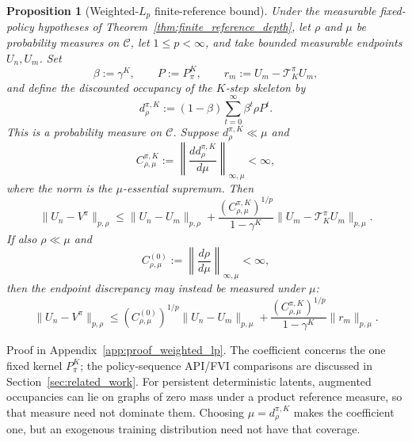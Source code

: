 \documentclass{article}
\theoremstyle{plain}
\newtheorem{proposition}[theorem]{Proposition}
\theoremstyle{definition}
\theoremstyle{remark}
\begin{document}
\begin{proposition}[Weighted-$L_p$ finite-reference bound]
\label{prop:weighted_finite_reference}
Under the measurable fixed-policy hypotheses of
Theorem~\ref{thm:finite_reference_depth}, let $\rho$ and $\mu$ be probability
measures on $\mathcal C$, let $1\le p<\infty$, and take bounded measurable
endpoints $U_n,U_m$. Set
\begin{equation}
\beta:=\gamma^K,
\qquad
P:=P_\pi^K,
\qquad
r_m:=U_m-\mathcal T_K^\pi U_m,
\label{eq:weighted_objects}
\end{equation}
and define the discounted occupancy of the $K$-step skeleton by
\begin{equation}
d_\rho^{\pi,K}
:=(1-\beta)\sum_{t=0}^{\infty}\beta^t\rho P^t.
\label{eq:k_skeleton_occupancy}
\end{equation}
This is a probability measure on $\mathcal C$. Suppose
$d_\rho^{\pi,K}\ll\mu$ and
\begin{equation}
C_{\rho,\mu}^{\pi,K}
:=
\left\|
\frac{d d_\rho^{\pi,K}}{d\mu}
\right\|_{\infty,\mu}
<\infty,
\label{eq:fixed_kernel_occupancy_ratio}
\end{equation}
where the norm is the $\mu$-essential supremum. Then
\begin{equation}
\|U_n-V^\pi\|_{p,\rho}
\le
\|U_n-U_m\|_{p,\rho}
+
\frac{(C_{\rho,\mu}^{\pi,K})^{1/p}}{1-\gamma^K}
\|U_m-\mathcal T_K^\pi U_m\|_{p,\mu}.
\label{eq:weighted_finite_reference}
\end{equation}
If also $\rho\ll\mu$ and
\begin{equation}
C_{\rho,\mu}^{(0)}
:=
\left\|\frac{d\rho}{d\mu}\right\|_{\infty,\mu}
<\infty,
\label{eq:initial_density_ratio}
\end{equation}
then the endpoint discrepancy may instead be measured under $\mu$:
\begin{equation}
\|U_n-V^\pi\|_{p,\rho}
\le
(C_{\rho,\mu}^{(0)})^{1/p}\|U_n-U_m\|_{p,\mu}
+
\frac{(C_{\rho,\mu}^{\pi,K})^{1/p}}{1-\gamma^K}
\|r_m\|_{p,\mu}.
\label{eq:weighted_finite_reference_common_measure}
\end{equation}
\end{proposition}

Proof in Appendix~\ref{app:proof_weighted_lp}.
The coefficient concerns the one fixed kernel $P_\pi^K$; the policy-sequence
API/FVI comparisons are discussed in Section~\ref{sec:related_work}.
For persistent deterministic latents, augmented occupancies can lie on
graphs of zero mass under a product reference measure, so that measure need
not dominate them. Choosing $\mu=d_\rho^{\pi,K}$ makes the coefficient one,
but an exogenous training distribution need not have that coverage.
\end{document}

